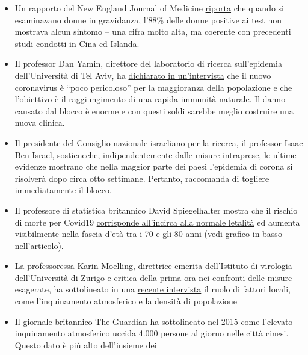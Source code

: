 \begin{itemize}
{  identico} nel numero di casi e dei decessi.
\item
  Un rapporto del New England Journal of Medicine
  \href{https://www.nejm.org/doi/full/10.1056/NEJMc2009316}{riporta} che
  quando si esaminavano donne in gravidanza, l'88\% delle donne positive
  ai test non mostrava alcun sintomo -- una cifra molto alta, ma
  coerente con precedenti studi condotti in Cina ed Islanda.
\item
  Il professor Dan Yamin, direttore del laboratorio di ricerca
  sull'epidemia dell'Università di Tel Aviv, ha
  \href{https://www.ynet.co.il/articles/0,7340,L-5714371,00.html}{dichiarato
  in un'intervista} che il nuovo coronavirus è ``poco pericoloso'' per
  la maggioranza della popolazione e che l'obiettivo è il raggiungimento
  di una rapida immunità naturale. Il danno causato dal blocco è enorme
  e con questi soldi sarebbe meglio costruire una nuova clinica.
\item
  Il presidente del Consiglio nazionale israeliano per la ricerca, il
  professor Isaac Ben-Israel,
  \href{http://www.israelnationalnews.com/News/News.aspx/278658}{sostiene}che,
  indipendentemente dalle misure intraprese, le ultime evidenze mostrano
  che nella maggior parte dei paesi l'epidemia di corona si risolverà
  dopo circa otto settimane. Pertanto, raccomanda di togliere
  immediatamente il blocco.
\item
  Il professore di statistica britannico David Spiegelhalter mostra che
  il rischio di morte per Covid19
  \href{https://medium.com/wintoncentre/how-much-normal-risk-does-covid-represent-4539118e1196}{corrisponde
  all'incirca alla normale letalità} ed aumenta visibilmente nella
  fascia d'età tra i 70 e gli 80 anni (vedi grafico in basso
  nell'articolo).
\item
  La professoressa Karin Moelling, direttrice emerita dell'Istituto di
  virologia dell'Università di Zurigo e
  \href{https://www.rubikon.news/artikel/die-stimme-der-vernunft}{critica
  della prima ora} nei confronti delle misure esagerate, ha sottolineato
  in una \href{https://www.youtube.com/watch?v=4rl2sqLcDoQ}{recente
  intervista} il ruolo di fattori locali, come l'inquinamento
  atmosferico e la densità di popolazione
\item
  Il giornale britannico The Guardian ha
  \href{https://www.theguardian.com/world/2015/aug/14/air-pollution-in-china-is-killing-4000-people-every-day-a-new-study-finds}{sottolineato}
  nel 2015 come l'elevato inquinamento atmosferico uccida 4.000 persone
  al giorno nelle città cinesi. Questo dato è più alto dell'insieme dei

\end{itemize}
